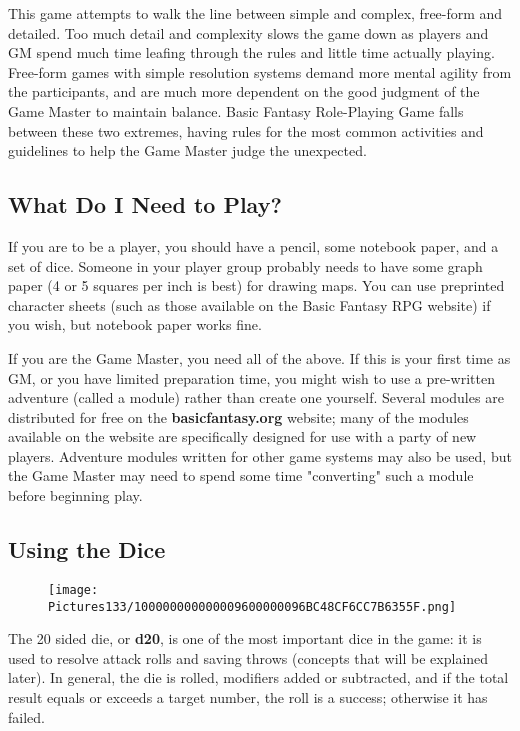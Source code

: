 \documentclass[a4paper,twoside,openany,10pt]{book}
\begin{document}
\begin{multicols}{2}
This game attempts to walk the line between simple and complex, free-form and detailed. Too much detail and complexity slows the game down as players and GM spend much time leafing through the rules and little time actually playing. Free-form games with simple resolution systems demand more mental agility from the participants, and are much more dependent on the good judgment of the Game Master to maintain balance. Basic Fantasy Role-Playing Game falls between these two extremes, having rules for the most common activities and guidelines to help the Game Master judge the unexpected.

\subsection{What Do I Need to Play?}\label{what-do-i-need-to-play}

If you are to be a player, you should have a pencil, some notebook paper, and a set of dice. Someone in your player group probably needs to have some graph paper (4 or 5 squares per inch is best) for drawing maps. You can use preprinted character sheets (such as those available on the Basic Fantasy RPG website) if you wish, but notebook paper works fine.

If you are the Game Master, you need all of the above. If this is your first time as GM, or you have limited preparation time, you might wish to use a pre-written adventure (called a module) rather than create one yourself. Several modules are distributed for free on the \textbf{basicfantasy.org} website; many of the modules available on the website are specifically designed for use with a party of new players. Adventure modules written for other game systems may also be used, but the Game Master may need to spend some time "converting" such a module before beginning play.

\bigskip

\subsection{Using the Dice}\label{using-the-dice}

\begin{wrapfigure}{r}{1.77cm}
	\texttt{[image: Pictures133/100000000000009600000096BC48CF6CC7B6355F.png]}
\end{wrapfigure}
The 20 sided die, or \textbf{d20}, is one of the most important dice in the
game: it is used to resolve attack rolls and saving throws (concepts
that will be explained later).  In general, the die is rolled, modifiers added or subtracted, and if the total result equals or exceeds a target number, the roll is a success; otherwise it has failed.


\end{multicols}
\end{document}
